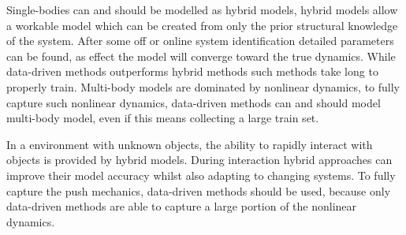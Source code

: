 Single-bodies can and should be modelled as hybrid models, hybrid models allow a workable model which can be created from only the prior structural knowledge of the system. After some off or online system identification detailed parameters can be found, as effect the model will converge toward the true dynamics. While data-driven methods outperforms hybrid methods such methods take long to properly train. Multi-body models are dominated by nonlinear dynamics, to fully capture such nonlinear dynamics, data-driven methods can and should model multi-body model, even if this means collecting a large train set. 

In a environment with unknown objects, the ability to rapidly interact with objects is provided by hybrid models. During interaction hybrid approaches can improve their model accuracy whilst also adapting to changing systems. To fully capture the push mechanics, data-driven methods should be used, because only data-driven methods are able to capture a large portion of the nonlinear dynamics.


%

